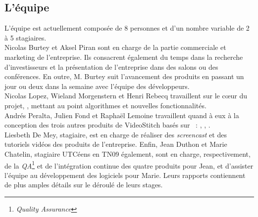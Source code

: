 \subsection{L'équipe}
L'équipe est actuellement composée de 8 personnes et d'un nombre variable de 2 à 5 stagiaires.\\
Nicolas Burtey et Aksel Piran sont en charge de
la partie commerciale et marketing de l'entreprise. Ils consacrent également
du temps dans la recherche d'investisseurs et la présentation de l'entreprise dans
des salons ou des conférences. En outre, M. Burtey suit l'avancement des produits
en passant un jour ou deux dans la semaine avec l'équipe des développeurs.\\
Nicolas Lopez, Wieland Morgenstern et Henri Rebecq travaillent sur le c\oe ur du
projet, , mettant au point algorithmes et nouvelles fonctionnalités.\\
Andrés Peralta, Julien Fond et Raphaël Lemoine travaillent quand à eux à la conception 
des trois autres produits de VideoStitch basés sur ~: 
, , .\\
Liesbeth De Mey, stagiaire, est en charge de réaliser des \textit{screencast} et 
des tutoriels vidéos des produits de l'entreprise. Enfin, Jean Duthon et Marie
Chatelin, stagiaire UTCéens en TN09 également, sont en charge, respectivement,
de la \textit{QA}\footnote{\textit{Quality Assurance}} et de l'intégration continue
des quatre produits pour Jean, et d'assister l'équipe au développement des logiciels
pour Marie. Leurs rapports contiennent de plus amples détails sur le déroulé de 
leurs stages.

